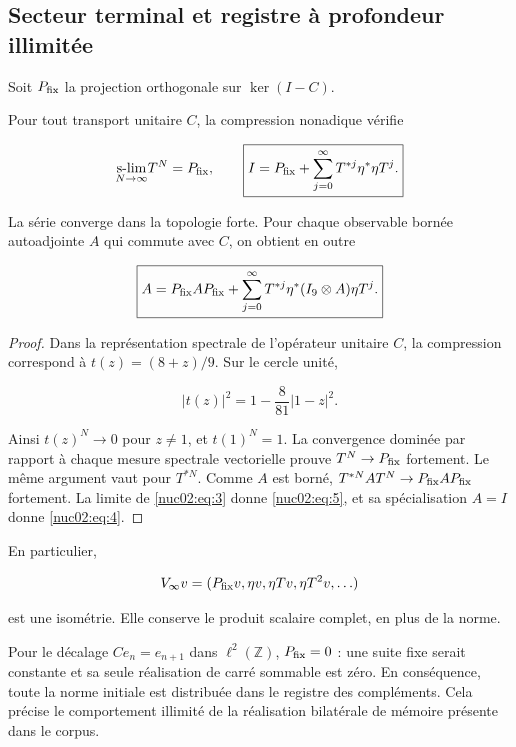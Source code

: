 \subsection{Secteur terminal et registre à profondeur illimitée
}

Soit \(P_{\rm fix}\) la projection orthogonale sur \(\ker(I-C)\).


\begin{theorem}
Pour tout transport unitaire \(C\), la compression nonadique vérifie

\begin{equation}
\underset{N\to\infty}{\operatorname{s-lim}}T^N=P_{\rm fix},\qquad
\boxed{I=P_{\rm fix}+\sum_{j=0}^{\infty}T^{*j}\eta^*\eta T^j.}\label{nuc02:eq:4}
\end{equation}

La série converge dans la topologie forte. Pour chaque observable bornée autoadjointe \(A\) qui commute avec \(C\), on obtient en outre


\begin{equation}
\boxed{A=P_{\rm fix}AP_{\rm fix}
+\sum_{j=0}^{\infty}T^{*j}\eta^*(I_9\otimes A)\eta T^j.}\label{nuc02:eq:5}
\end{equation}
\end{theorem}

\begin{proof}
Dans la représentation spectrale de l’opérateur unitaire \(C\), la compression correspond à \(t(z)=(8+z)/9\). Sur le cercle unité,

\[
|t(z)|^2=1-\frac8{81}|1-z|^2.
\]

Ainsi \(t(z)^N\to0\) pour \(z\ne1\), et \(t(1)^N=1\). La convergence dominée par rapport à chaque mesure spectrale vectorielle prouve \(T^N\to P_{\rm fix}\) fortement. Le même argument vaut pour \(T^{*N}\). Comme \(A\) est borné, \(T^{*N}AT^N\to P_{\rm fix}AP_{\rm fix}\) fortement. La limite de \eqref{nuc02:eq:3} donne \eqref{nuc02:eq:5}, et sa spécialisation \(A=I\) donne \eqref{nuc02:eq:4}.
\end{proof}

En particulier,

\[
V_\infty v=(P_{\rm fix}v,\eta v,\eta Tv,\eta T^2v,\ldots)
\]

est une isométrie. Elle conserve le produit scalaire complet, en plus de la norme.


\begin{corollary}
Pour le décalage \(Ce_n=e_{n+1}\) dans \(\ell^2(\mathbb Z)\), \(P_{\rm fix}=0\) : une suite fixe serait constante et sa seule réalisation de carré sommable est zéro. En conséquence, toute la norme initiale est distribuée dans le registre des compléments. Cela précise le comportement illimité de la réalisation bilatérale de mémoire présente dans le corpus.
\end{corollary}

